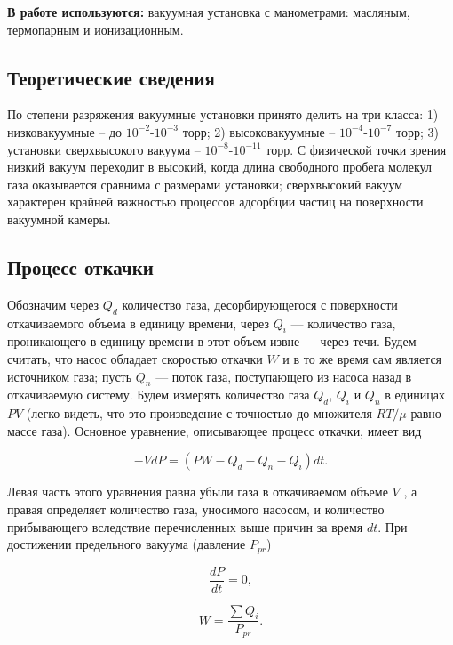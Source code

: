 \documentclass[12pt,a4paper]{article}
\begin{document}
\textbf{В работе используются:} вакуумная установка с манометрами: масляным, термопарным и ионизационным.

\subsection{Теоретические сведения}

По степени разряжения вакуумные установки принято делить на три класса: 1) низковакуумные -- до $10^{-2}$-$10^{-3}$ торр; 2) высоковакуумные -- $10^{-4}$-$10^{-7}$ торр; 3) установки сверхвысокого вакуума -- $10^{-8}$-$10^{-11}$ торр. С физической точки зрения низкий вакуум переходит в высокий, когда длина свободного пробега молекул газа оказывается сравнима с размерами установки; сверхвысокий вакуум характерен крайней важностью процессов адсорбции частиц на поверхности вакуумной камеры.

\subsection*{Процесс откачки}

Обозначим через $Q_d$ количество газа, десорбирующегося с поверхности откачиваемого объема в единицу времени, через $Q_i$ — количество газа, проникающего в единицу времени в этот объем извне — через течи. Будем считать, что насос обладает скоростью откачки $W$ и в то же время сам является источником газа; пусть $Q_n$ — поток газа, поступающего из насоса назад в откачиваемую систему. Будем измерять количество газа $Q_d$, $Q_i$ и $Q_n$ в единицах $PV$ (легко видеть, что это произведение с точностью до множителя $RT/ \mu$ равно массе газа). Основное уравнение, описывающее процесс откачки, имеет вид

\begin{equation}
\label{otkachka}
	-VdP=(PW-Q_d-Q_n-Q_i)dt.
\end{equation}

Левая часть этого уравнения равна убыли газа в откачиваемом объеме $V$ , а правая определяет количество газа, уносимого насосом, и количество прибывающего вследствие перечисленных выше причин
за время $dt$. При достижении предельного вакуума (давление $P_{pr}$)

\begin{equation}
\label{predel_1}
	\frac{dP}{dt}=0,
\end{equation}

\begin{equation}
\label{predel_2}
	W=\frac{\sum Q_i}{P_{pr}}.
\end{equation}
\end{document}

